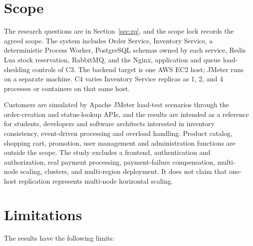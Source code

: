 \documentclass[a4paper]{report}
\begin{document}
\section{Scope}

The research questions are in Section~\ref{sec:rq}, and the scope lock
records the agreed scope. The system includes Order Service, Inventory
Service, a deterministic Process Worker,
PostgreSQL schemas owned by each service, Redis Lua stock reservation, RabbitMQ,
and the Nginx, application and queue load-shedding controls of C3. The backend target
is one AWS EC2 host; JMeter runs on a separate machine. C4 varies Inventory Service
replicas as 1, 2, and 4 processes or containers on that same host.

Customers are simulated by Apache JMeter load-test scenarios through the
order-creation and status-lookup APIs, and the results are intended as a
reference for students, developers and software architects interested in
inventory consistency, event-driven processing and overload handling.
Product catalog, shopping cart, promotion, user management and administration
functions are outside the scope.
The study excludes a frontend, authentication and authorization, real payment
processing, payment-failure compensation, multi-node scaling, clusters, and
multi-region deployment. It does not claim that one-host replication represents
multi-node horizontal scaling.

\section{Limitations}

The results have the following limits:
\end{document}
